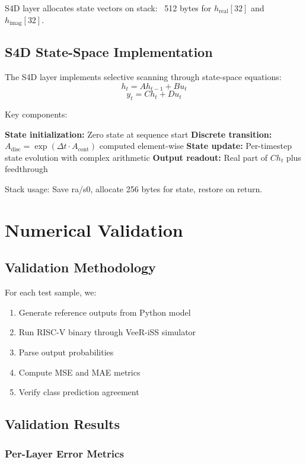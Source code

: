 \documentclass[conference]{IEEEtran}
\begin{document}
S4D layer allocates state vectors on stack: ~512 bytes for $h_{\text{real}}[32]$ and $h_{\text{imag}}[32]$.

\subsection{S4D State-Space Implementation}

The S4D layer implements selective scanning through state-space equations:
$$h_t = A h_{t-1} + B u_t$$
$$y_t = C h_t + D u_t$$

Key components:

\textbf{State initialization:} Zero state at sequence start
\textbf{Discrete transition:} $A_{\text{disc}} = \exp(\Delta t \cdot A_{\text{cont}})$ computed element-wise
\textbf{State update:} Per-timestep state evolution with complex arithmetic
\textbf{Output readout:} Real part of $C h_t$ plus feedthrough

Stack usage: Save ra/s0, allocate 256 bytes for state, restore on return.

\section{Numerical Validation}

\subsection{Validation Methodology}

For each test sample, we:
\begin{enumerate}
    \item Generate reference outputs from Python model
    \item Run RISC-V binary through VeeR-iSS simulator
    \item Parse output probabilities
    \item Compute MSE and MAE metrics
    \item Verify class prediction agreement
\end{enumerate}

\subsection{Validation Results}

\subsubsection{Per-Layer Error Metrics}
\end{document}
